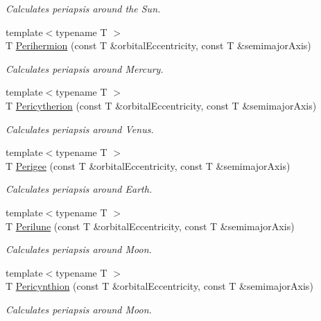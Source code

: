 \begin{DoxyCompactItemize}
\begin{DoxyCompactList}\small\item\em Calculates periapsis around the Sun. \end{DoxyCompactList}\item 
{\footnotesize template$<$typename T $>$ }\\T \mbox{\hyperlink{group___e_g_x_phys-_periapsis_ga9562e9cbfd73019ae9cdaa643b843d63}{Perihermion}} (const T \&orbital\+Eccentricity, const T \&semimajor\+Axis)
\begin{DoxyCompactList}\small\item\em Calculates periapsis around Mercury. \end{DoxyCompactList}\item 
{\footnotesize template$<$typename T $>$ }\\T \mbox{\hyperlink{group___e_g_x_phys-_periapsis_gaa270e364cbbd7d3d6212872df484926f}{Pericytherion}} (const T \&orbital\+Eccentricity, const T \&semimajor\+Axis)
\begin{DoxyCompactList}\small\item\em Calculates periapsis around Venus. \end{DoxyCompactList}\item 
{\footnotesize template$<$typename T $>$ }\\T \mbox{\hyperlink{group___e_g_x_phys-_periapsis_gae2d053caf69cb0b4c3207064a2ab143a}{Perigee}} (const T \&orbital\+Eccentricity, const T \&semimajor\+Axis)
\begin{DoxyCompactList}\small\item\em Calculates periapsis around Earth. \end{DoxyCompactList}\item 
{\footnotesize template$<$typename T $>$ }\\T \mbox{\hyperlink{group___e_g_x_phys-_periapsis_ga2cc7ab05e18d32c94d8d74972e032793}{Perilune}} (const T \&orbital\+Eccentricity, const T \&semimajor\+Axis)
\begin{DoxyCompactList}\small\item\em Calculates periapsis around Moon. \end{DoxyCompactList}\item 
{\footnotesize template$<$typename T $>$ }\\T \mbox{\hyperlink{group___e_g_x_phys-_periapsis_gaeeba153b188cd06cbd233eaef12f0a6a}{Pericynthion}} (const T \&orbital\+Eccentricity, const T \&semimajor\+Axis)
\begin{DoxyCompactList}\small\item\em Calculates periapsis around Moon. \end{DoxyCompactList}\item 

\end{DoxyCompactItemize}
